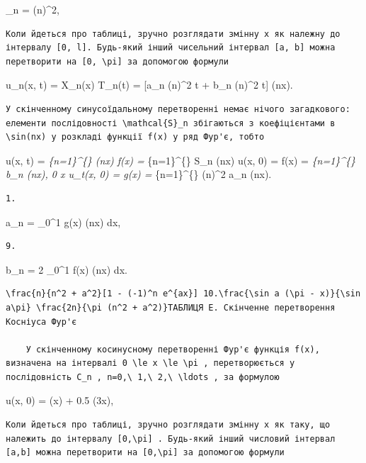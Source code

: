 \documentclass[
  ukrainian,
]{article}
\begin{document}
\omega\_n = (n\pi)\^{}2,

\begin{verbatim}
Коли йдеться про таблиці, зручно розглядати змінну x як належну до інтервалу [0, l]. Будь-який інший чисельний інтервал [a, b] можна перетворити на [0, \pi] за допомогою формули
\end{verbatim}

u\_n(x, t) = X\_n(x) T\_n(t) = {[}a\_n \sin(n\pi)\^{}2 t + b\_n
\cos(n\pi)\^{}2 t{]} \sin(n\pi x).

\begin{verbatim}
У скінченному синусоїдальному перетворенні немає нічого загадкового: елементи послідовності \mathcal{S}_n збігаються з коефіцієнтами в \sin(nx) у розкладі функції f(x) у ряд Фур'є, тобто
\end{verbatim}

u(x, t) = \sum\emph{\{n=1\}\^{}\{\infty\}
 \sin(n\pi x) f(x)
= \sum}\{n=1\}\^{}\{\infty\} S\_n \sin(nx) u(x, 0) = f(x) =
\sum\emph{\{n=1\}\^{}\{\infty\} b\_n \sin(n\pi x), 0 \le x \le \pi
u\_t(x, 0) = g(x) = \sum}\{n=1\}\^{}\{\infty\} (n\pi)\^{}2 a\_n
\sin(n\pi x).

\begin{verbatim}
1.
\end{verbatim}

a\_n =  \int\_0\^{}1 g(x) \sin(n\pi x) dx,

\begin{verbatim}
9.
\end{verbatim}

b\_n = 2 \int\_0\^{}1 f(x) \sin(n\pi x) dx.

\begin{verbatim}
\frac{n}{n^2 + a^2}[1 - (-1)^n e^{ax}] 10.\frac{\sin a (\pi - x)}{\sin a\pi} \frac{2n}{\pi (n^2 + a^2)}ТАБЛИЦЯ E. Скінченне перетворення Косніуса Фур'є

    У скінченному косинусному перетворенні Фур'є функція f(x), визначена на інтервалі 0 \le x \le \pi , перетворюється у послідовність C_n , n=0,\ 1,\ 2,\ \ldots , за формулою
\end{verbatim}

u(x, 0) = \sin(\pi x) + 0.5 \sin(3\pi x),

\begin{verbatim}
Коли йдеться про таблиці, зручно розглядати змінну x як таку, що належить до інтервалу [0,\pi] . Будь-який інший числовий інтервал [a,b] можна перетворити на [0,\pi] за допомогою формули
\end{verbatim}
\end{document}
